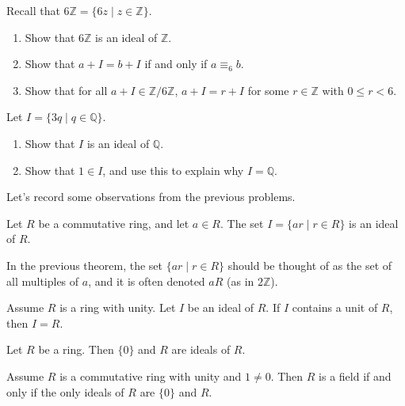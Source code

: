 \begin{problem}\label{prob.RepresentIntegerIdealsWithSmallNumber}
Recall that $6\mathbb{Z} = \{6z \mid z\in \mathbb{Z}\}$.
\begin{enumerate}
\item Show that $6\mathbb{Z}$ is an ideal of $\mathbb{Z}$.
\item Show that $a + I = b + I$ if and only if $a \equiv_6 b$.
\item Show that for all $a + I\in\mathbb{Z}/6\mathbb{Z}$, $a + I = r + I$ for some $r \in \mathbb{Z}$ with $0 \le r < 6$.
\end{enumerate}
\end{problem}

\begin{problem}
Let $I = \{3q \mid q\in \mathbb{Q}\}$.
\begin{enumerate}
\item Show that $I$ is an ideal of $\mathbb{Q}$.
\item Show that $1\in I$, and use this to explain why $I =  \mathbb{Q}$.
\end{enumerate}
\end{problem}

Let's record some observations from the previous problems.

\begin{theorem}\label{thm.MultiplesFormIdeal}
Let $R$ be a commutative ring, and let $a\in R$. The set $I = \{ar\mid r\in R\}$ is an ideal of $R$.
\end{theorem}

In the previous theorem, the set $\{ar\mid r\in R\}$ should be thought of as the set of all multiples of $a$, and it is often denoted $aR$ (as in $2\mathbb{Z}$).

\begin{theorem}\label{thm.IdealContainingUnitsEqualsR}
Assume $R$ is a ring with unity. Let $I$ be an ideal of $R$. If $I$ contains a unit of $R$, then $I = R$.
\end{theorem}

\begin{theorem}
Let $R$ be a ring. Then $\{0\}$ and $R$ are ideals of $R$.
\end{theorem}

\begin{theorem}\label{thm.CharacterizeFieldWithIdeals}
Assume $R$ is a commutative ring with unity and $1\neq 0$. Then $R$ is a field if and only if the only ideals of $R$ are $\{0\}$ and $R$.
\end{theorem}

